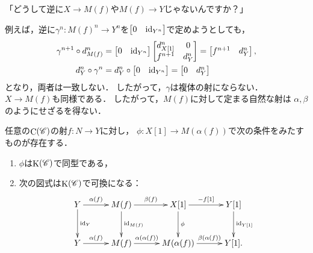 \begin{com*}[4/24]
    「どうして逆に$X\to M(f)$や$M(f)\to Y$じゃないんですか？」
    
    例えば，逆に$\gamma^n \colon M(f)^n\to Y^n$を$\begin{bmatrix*}
        0&\id_{Y^n}
    \end{bmatrix*}$で定めようとしても，
    \begin{align*}
        \gamma^{n+1}\circ d_{M(f)}^{n}
        &=\begin{bmatrix*}
            0&\id_{Y^n}
        \end{bmatrix*}\begin{bmatrix*}
            d_{X[1]}^n & 0\\
            f^{n+1} & d_Y^n\\
        \end{bmatrix*}
        =\begin{bmatrix*}
            f^{n+1}&d_Y^n
        \end{bmatrix*},\\
        d_{Y}^n\circ \gamma^{n}
        &=d_Y^n\circ
        \begin{bmatrix*}
            0&\id_{Y^n}
        \end{bmatrix*}
        =
        \begin{bmatrix*}
            0&d_Y^n
        \end{bmatrix*}
    \end{align*}
    となり，両者は一致しない．
    したがって，$\gamma$は複体の射にならない．
    $X\to M(f)$も同様である．
    したがって，$M(f)$に対して定まる自然な射は
    $\alpha, \beta$のようにせざるを得ない．
\end{com*}

\begin{Lemma}
    任意の$\mathop{\mathrm{C}}\nolimits(\mathscr{C})$の射$f\colon N\to Y$に対し，
    $\phi\colon X[1]\to M(\alpha(f))$で次の条件をみたすものが存在する．
    \begin{enumerate}
        \item $\phi$は$\mathop{\mathrm{K}}\nolimits(\mathscr{C})$で同型である，
        \item 次の図式は$\mathop{\mathrm{K}}\nolimits(\mathscr{C})$で可換になる：    
        \begin{equation*}
            \vcenter{\xymatrix@C=30pt@R=30pt{
            Y \ar[r]^-{\alpha(f)}
            \ar[d]^-{\id_Y}
            & 
            M(f)
            \ar[r]^-{\beta(f)}
            \ar[d]^-{\id_{M(f)}}
            &
            X[1]
            \ar[r]^-{-f[1]}
            \ar[d]^-{\phi} 
            &
            Y[1]
            \ar[d]^-{\id_{Y[1]}}
            \\
            Y 
            \ar[r]^-{\alpha(f)}
            & 
            M(f)
            \ar[r]^-{\alpha(\alpha(f))}
            &
            M(\alpha(f))
            \ar[r]^-{\beta(\alpha(f))}
            &
            Y[1].
            }}
        \end{equation*}
    \end{enumerate}
\end{Lemma}

